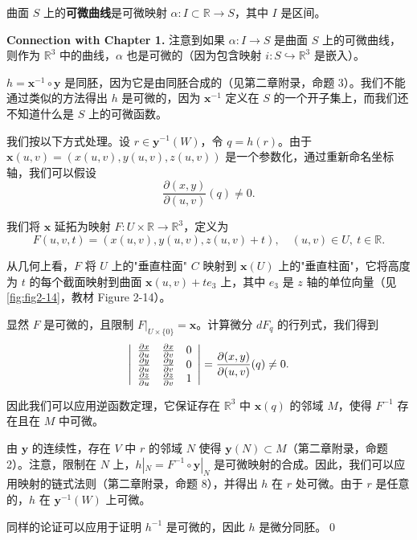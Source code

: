 \begin{Definition}[可微曲线]\label{def:differentiable-curve-on-surface}
曲面 $S$ 上的\textbf{可微曲线}是可微映射 $\alpha: I \subset \mathbb{R} \to S$，其中 $I$ 是区间。
\end{Definition}

\textbf{Connection with Chapter 1.} 注意到如果 $\alpha: I \to S$ 是曲面 $S$ 上的可微曲线，则作为 $\mathbb{R}^3$ 中的曲线，$\alpha$ 也是可微的（因为包含映射 $i: S \hookrightarrow \mathbb{R}^3$ 是嵌入）。

\begin{Proof}[命题 1 的完整证明]
$h = \mathbf{x}^{-1} \circ \mathbf{y}$ 是同胚，因为它是由同胚合成的（见第二章附录，命题 3）。我们不能通过类似的方法得出 $h$ 是可微的，因为 $\mathbf{x}^{-1}$ 定义在 $S$ 的一个开子集上，而我们还不知道什么是 $S$ 上的可微函数。

我们按以下方式处理。设 $r \in \mathbf{y}^{-1}(W)$，令 $q = h(r)$。由于 $\mathbf{x}(u,v) = (x(u,v), y(u,v), z(u,v))$ 是一个参数化，通过重新命名坐标轴，我们可以假设
\[
\frac{\partial(x,y)}{\partial(u,v)}(q) \neq 0.
\]

我们将 $\mathbf{x}$ 延拓为映射 $F: U \times \mathbb{R} \to \mathbb{R}^3$，定义为
\[
F(u,v,t) = (x(u,v), y(u,v), z(u,v) + t),\quad (u,v) \in U,\ t \in \mathbb{R}.
\]

从几何上看，$F$ 将 $U$ 上的"垂直柱面" $C$ 映射到 $\mathbf{x}(U)$ 上的"垂直柱面"，它将高度为 $t$ 的每个截面映射到曲面 $\mathbf{x}(u,v) + t e_3$ 上，其中 $e_3$ 是 $z$ 轴的单位向量（见 \cref{fig:fig2-14}，教材 Figure 2-14）。

显然 $F$ 是可微的，且限制 $F|_{U \times \{0\}} = \mathbf{x}$。计算微分 $dF_q$ 的行列式，我们得到
\[
\left| \begin{array}{c c c} \frac{\partial x}{\partial u} & \frac{\partial x}{\partial v} & 0 \\ \frac{\partial y}{\partial u} & \frac{\partial y}{\partial v} & 0 \\ \frac{\partial z}{\partial u} & \frac{\partial z}{\partial v} & 1 \end{array} \right| = \frac{\partial(x,y)}{\partial(u,v)}(q) \neq 0.
\]

因此我们可以应用逆函数定理，它保证存在 $\mathbb{R}^3$ 中 $\mathbf{x}(q)$ 的邻域 $M$，使得 $F^{-1}$ 存在且在 $M$ 中可微。

由 $\mathbf{y}$ 的连续性，存在 $V$ 中 $r$ 的邻域 $N$ 使得 $\mathbf{y}(N) \subset M$（第二章附录，命题 2）。注意，限制在 $N$ 上，$h|_N = F^{-1} \circ \mathbf{y}|_N$ 是可微映射的合成。因此，我们可以应用映射的链式法则（第二章附录，命题 8），并得出 $h$ 在 $r$ 处可微。由于 $r$ 是任意的，$h$ 在 $\mathbf{y}^{-1}(W)$ 上可微。

同样的论证可以应用于证明 $h^{-1}$ 是可微的，因此 $h$ 是微分同胚。\qed
\end{Proof}

